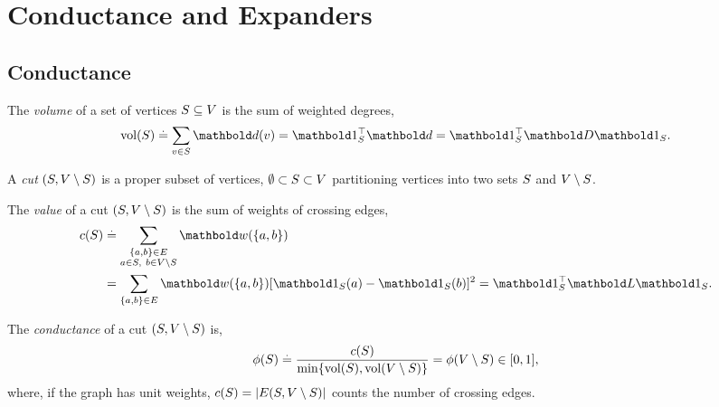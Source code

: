 
\chapter{Conductance and Expanders}

\section{Conductance}

\begin{defn}[Volume] The \emph{volume} of a set of vertices $S \subseteq V$ is the sum of weighted degrees, \begin{align}
    \vol(S) \defeq \sum_{v \in \sS} \vd(v) = \trans{\vOne_\sS}\vd = \trans{\vOne_\sS}\mD\vOne_\sS.
\end{align}
\end{defn}

A \emph{cut} $(S, V \setminus S)$ is a proper subset of vertices, $\emptyset \subset S \subset V$ partitioning vertices into two sets $S$ and $V \setminus S$.

\begin{defn} The \emph{value} of a cut $(S, V \setminus S)$ is the sum of weights of crossing edges, \begin{align}\begin{split}
    c(\sS) &\defeq \sum_{\substack{\{a,b\} \in \sE \\ a \in \sS,\ b \in \sV \setminus \sS}} \vw(\{a,b\}) \\
    &= \sum_{\{a,b\}\in\sE} \vw(\{a,b\}) [\vOne_\sS(a) - \vOne_\sS(b)]^2 = \trans{\vOne_\sS}\mL\vOne_\sS.
\end{split}\end{align}
\end{defn}

\begin{defn} The \emph{conductance} of a cut $(S, V \setminus S)$ is, \begin{align}
    \phi(S) \overset{.}{=} \frac{c(S)}{\min\{\mathrm{vol}(S), \mathrm{vol}(V \setminus S)\}} = \phi(V \setminus S) \in [0,1],
\end{align} where, if the graph has unit weights, $c(S) = |E(S, V \setminus S)|$ counts the number of crossing edges.
\end{defn}


